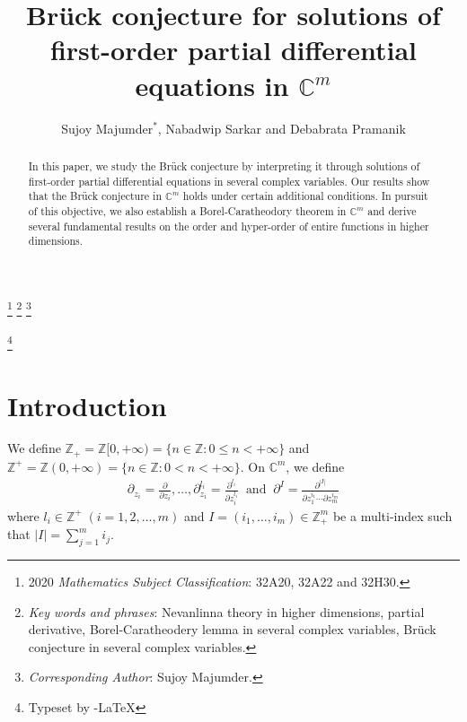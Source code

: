 \documentclass[11pt, reqno]{amsart}
\numberwithin{equation}{section}
\begin{document}
\title[B\MakeLowercase{r\"{u}ck conjecture for solutions of first-order partial differential equations}......]{\LARGE B\Large\MakeLowercase{r\"{u}ck conjecture for solutions of first-order partial differential equations in} $\mathbb{C}^m$}


\date{}
\author[S. M\MakeLowercase{ajumder}, N. S\MakeLowercase{arkar} \MakeLowercase{and} D. P\MakeLowercase{ramanik}]{S\MakeLowercase{ujoy} M\MakeLowercase{ajumder}$^*$, N\MakeLowercase{abadwip} S\MakeLowercase{arkar} \MakeLowercase{and} D\MakeLowercase{ebabrata} P\MakeLowercase{ramanik}}
\address{Department of Mathematics, Raiganj University, Raiganj, West Bengal-733134, India.}
\address{Department of Mathematics, Raiganj University, Raiganj, West Bengal-733134, India.}
\address{Department of Mathematics, Raiganj University, Raiganj, West Bengal-733134, India.}


\renewcommand{\thefootnote}{}
\footnote{2020 \emph{Mathematics Subject Classification}: 32A20, 32A22 and 32H30.}
\footnote{\emph{Key words and phrases}: Nevanlinna theory in higher dimensions, partial
derivative, Borel-Caratheodery lemma in several complex variables, Br\"{u}ck conjecture in several complex variables.}
\footnote{\emph{Corresponding Author}: Sujoy Majumder.}

\renewcommand{\thefootnote}{\arabic{footnote}}
\setcounter{footnote}{0}

\begin{abstract} In this paper, we study the Br\"{u}ck conjecture \cite{Bruck-1996} by interpreting it through solutions of first-order partial differential equations in several complex variables. Our results show that the Br\"{u}ck conjecture \cite{Bruck-1996} 
in $\mathbb{C}^m$ holds under certain additional conditions. In pursuit of this objective, we also establish a Borel-Caratheodory theorem in $\mathbb{C}^m$ and derive several fundamental results on the order and hyper-order of entire functions in higher dimensions.
\end{abstract}

\thanks{Typeset by \AmS -\LaTeX}
\maketitle


\section{{\bf Introduction}}
We define $\mathbb{Z}_+=\mathbb{Z}[0,+\infty)=\{n\in \mathbb{Z}: 0\leq n<+\infty\}$ and $\mathbb{Z}^+=\mathbb{Z}(0,+\infty)=\{n\in \mathbb{Z}: 0<n<+\infty\}$.
On $\mathbb{C}^m$, we define
\begin{align*}
\partial_{z_i}=\frac{\partial}{\partial z_i},\ldots, \partial_{z_i}^{l_i}=\frac{\partial^{l_i}}{\partial z_i^{l_i}}\;\;\text{and}\;\;\partial^{I}=\frac{\partial^{|I|}}{\partial z_1^{i_1}\cdots \partial z_m^{i_m}}
\end{align*}
where $l_i\in \mathbb{Z}^+\;(i=1,2,\ldots,m)$ and $I=(i_1,\ldots,i_m)\in\mathbb{Z}^m_+$ be a multi-index such that $|I|=\sum_{j=1}^m i_j$.
\smallskip
\end{document}
